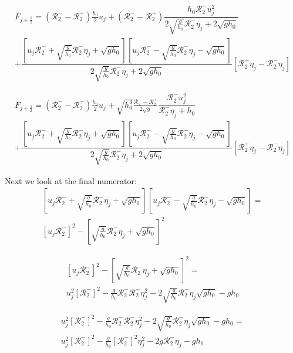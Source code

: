 \documentclass[12pt]{article}
\begin{document}
\begin{multline}
F_{j+\frac{1}{2}} = \left( \mathcal{R}_2^-  - \mathcal{R}_2^+ \right) \frac{h_0}{2}u_j + \left( \mathcal{R}_2^-  - \mathcal{R}_2^+ \right)\dfrac{h_0 \mathcal{R}_2^- u_{j}^2}{2\sqrt{\frac{g}{h_0}} \mathcal{R}_2^-\eta_{j}  + 2\sqrt{gh_0}}  \\
+ \dfrac{\left[u_{j}\mathcal{R}_2^- + \sqrt{\frac{g}{h_0}} \mathcal{R}_2^- \eta_{j} + \sqrt{gh_0}\right] \left[u_{j}\mathcal{R}_2^- - \sqrt{\frac{g}{h_0}} \mathcal{R}_2^- \eta_{j} - \sqrt{gh_0}\right]}{2\sqrt{\frac{g}{h_0}} \mathcal{R}_2^-\eta_{j}  + 2\sqrt{gh_0} } \left [ \mathcal{R}_2^+\eta_j - \mathcal{R}_2^-\eta_j\right ]
\end{multline}

\begin{multline}
F_{j+\frac{1}{2}} = \left( \mathcal{R}_2^-  - \mathcal{R}_2^+ \right) \frac{h_0}{2}u_j + \sqrt{h_0^3}\frac{\mathcal{R}_2^-  - \mathcal{R}_2^+}{2 \sqrt{g}} \dfrac{\mathcal{R}_2^- u_{j}^2}{\mathcal{R}_2^-\eta_{j}  + h_0}  \\
+ \dfrac{\left[u_{j}\mathcal{R}_2^- + \sqrt{\frac{g}{h_0}} \mathcal{R}_2^- \eta_{j} + \sqrt{gh_0}\right] \left[u_{j}\mathcal{R}_2^- - \sqrt{\frac{g}{h_0}} \mathcal{R}_2^- \eta_{j} - \sqrt{gh_0}\right]}{2\sqrt{\frac{g}{h_0}} \mathcal{R}_2^-\eta_{j}  + 2\sqrt{gh_0} } \left [ \mathcal{R}_2^+\eta_j - \mathcal{R}_2^-\eta_j\right ]
\end{multline}

Next we look at the final numerator:
\begin{multline}
\left[u_{j}\mathcal{R}_2^- + \sqrt{\frac{g}{h_0}} \mathcal{R}_2^- \eta_{j} + \sqrt{gh_0}\right] \left[u_{j}\mathcal{R}_2^- - \sqrt{\frac{g}{h_0}} \mathcal{R}_2^- \eta_{j} - \sqrt{gh_0}\right]= \\
\left[u_{j}\mathcal{R}_2^-\right]^2 - \left[ \sqrt{\frac{g}{h_0}} \mathcal{R}_2^- \eta_{j} + \sqrt{gh_0}\right]^2
\end{multline}

\begin{multline}
\left[u_{j}\mathcal{R}_2^-\right]^2 - \left[ \sqrt{\frac{g}{h_0}} \mathcal{R}_2^- \eta_{j} + \sqrt{gh_0}\right]^2 = \\
u_{j}^2 \left[\mathcal{R}_2^-\right]^2 - \frac{g}{h_0} \mathcal{R}_2^-  \mathcal{R}_2^- \eta_{j}^2 - 2\sqrt{\frac{g}{h_0}} \mathcal{R}_2^- \eta_{j} \sqrt{gh_0} - gh_0
\end{multline}

\begin{multline}
u_{j}^2 \left[\mathcal{R}_2^-\right]^2 - \frac{g}{h_0} \mathcal{R}_2^-  \mathcal{R}_2^- \eta_{j}^2 - 2\sqrt{\frac{g}{h_0}} \mathcal{R}_2^- \eta_{j} \sqrt{gh_0} - gh_0 = \\
u_{j}^2 \left[\mathcal{R}_2^-\right]^2 - \frac{g}{h_0} \left[\mathcal{R}_2^-\right]^2 \eta_{j}^2 - 2 g \mathcal{R}_2^- \eta_{j} - gh_0
\end{multline}
\end{document}

